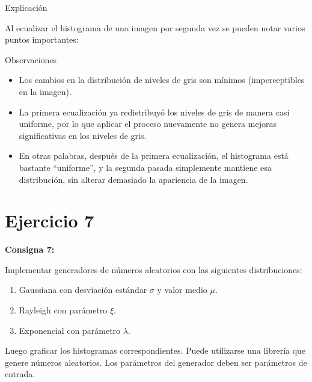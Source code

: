 \documentclass{beamer}
\begin{document}
\begin{frame}{Explicación}
	\justifying
	\footnotesize
	
	Al ecualizar el histograma de una imagen por segunda vez se pueden notar varios puntos importantes:
	
	\begin{block}{Observaciones}
		\begin{itemize}
			\item Los cambios en la distribución de niveles de gris son mínimos 
			(\textcolor{unahurverde}{imperceptibles en la imagen}).
			
			\item La primera ecualización ya redistribuyó los niveles de gris 
			de manera casi uniforme, por lo que aplicar el proceso nuevamente 
			no genera mejoras significativas en los niveles de gris.
			
			\item En otras palabras, después de la primera ecualización, 
			el histograma está bastante \textcolor{unahurverde}{“uniforme”}, y la segunda pasada simplemente mantiene esa distribución, 
			sin alterar demasiado la apariencia de la imagen.
		\end{itemize}
	\end{block}
\end{frame}


\section{Ejercicio 7}

\begin{frame}
	\begin{center}
		\textcolor{unahurverde}{\textbf{Consigna 7:}}
	\end{center}
	\justifying
	
	Implementar generadores de números aleatorios con las siguientes distribuciones:
	
	\begin{enumerate}%
		\item Gaussiana con desviación estándar $\sigma$ y valor medio $\mu$.
		\item Rayleigh con parámetro $\xi$.
		\item Exponencial con parámetro $\lambda$.
	\end{enumerate}
	
	\vspace{0.3cm}
	
	Luego graficar los histogramas correspondientes.  
	Puede utilizarse una librería que genere números aleatorios.  
	Los parámetros del generador deben ser parámetros de entrada.
\end{frame}
\end{document}
